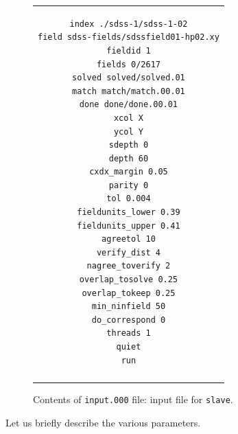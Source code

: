 \documentclass[12pt,letterpaper,titlepage]{article}
\newcommand{\code}[1]{\texttt{#1}}
\begin{document}
\begin{figure}[h!]
\begin{center}
\begin{tabular}{|@{\hspace{24pt}}c@{\hspace{24pt}}|}
\hline
\begin{minipage}{0.6\textwidth}
\vspace{10pt}
\begin{verbatim}
index ./sdss-1/sdss-1-02
field sdss-fields/sdssfield01-hp02.xy
fieldid 1
fields 0/2617
solved solved/solved.01
match match/match.00.01
done done/done.00.01
xcol X
ycol Y
sdepth 0
depth 60
cxdx_margin 0.05
parity 0
tol 0.004
fieldunits_lower 0.39
fieldunits_upper 0.41
agreetol 10
verify_dist 4
nagree_toverify 2
overlap_tosolve 0.25
overlap_tokeep 0.25
min_ninfield 50
do_correspond 0
threads 1
quiet
run
\end{verbatim}
\end{minipage}%
\\
\rule{0pt}{4pt} \\
\hline
\end{tabular}
\end{center}
\caption{Contents of \code{input.000} file: input file for \code{slave}.}
\label{input000}
\end{figure}

Let us briefly describe the various parameters.
\end{document}
